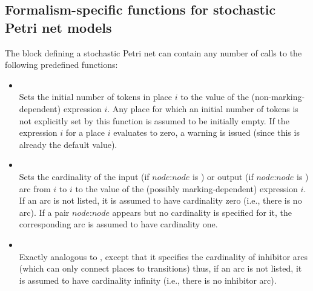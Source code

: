\begin{developer}

\section{Formalism-specific functions for stochastic Petri net models}
\label{SEC:spn-predefined-builder-functions}



The block defining a stochastic Petri net can contain any number
of calls to the following predefined functions:

\begin{itemize}

\item
{}\\
Sets the initial number of tokens in place $i$ to the value of the
(non-marking-dependent)  expression $i$.
Any place for which an initial number of tokens is not explicitly set
by this function is assumed to be initially empty.
If the expression $i$ for a place $i$ evaluates to zero,
a warning is issued (since this is already the default value).

\item
{}\\
Sets the cardinality of the input (if $node$:$node$ is )
or output (if  $node$:$node$ is ) arc
from $i$ to $i$ to the value of the
(possibly marking-dependent)  expression $i$.
If an arc is not listed, it is assumed to have cardinality zero
(i.e., there is no arc).
If a pair $node$:$node$ appears but no cardinality is specified for it, the
corresponding arc is assumed to have cardinality one.

\item
{}\\
Exactly analogous to , except that it specifies the cardinality of
inhibitor arcs (which can only connect places to transitions) thus,
if an arc is not listed, it is assumed to have cardinality infinity
(i.e., there is no inhibitor arc).


\end{itemize}
\end{developer}
